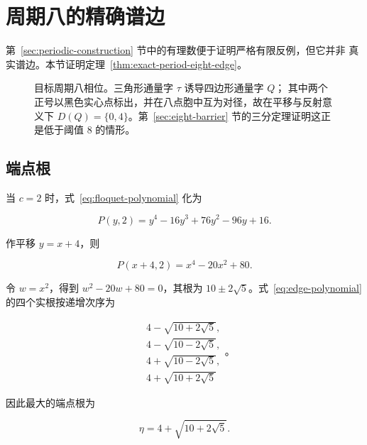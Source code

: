 \section{周期八的精确谱边}\label{sec:period-eight-edge}

第~\ref{sec:periodic-construction} 节中的有理数便于证明严格有限反例，但它并非
真实谱边。本节证明定理~\ref{thm:exact-period-eight-edge}。

\begin{figure}[H]
\centering

\caption{目标周期八相位。三角形通量字 \(\tau\) 诱导四边形通量字 \(Q\)；
其中两个正号以黑色实心点标出，并在八点胞中互为对径，故在平移与反射意义下
\(D(Q)=\{0,4\}\)。第~\ref{sec:eight-barrier} 节的三分定理证明这正是低于阈值
8 的情形。}
\label{fig:period8-target}
\end{figure}

\subsection{端点根}

当 \(c=2\) 时，式~\eqref{eq:floquet-polynomial} 化为

\begin{equation}
\label{eq:edge-polynomial}
P(y,2)=y^{4}-16y^{3}+76y^{2}-96y+16.
\end{equation}

作平移 \(y=x+4\)，则

\begin{equation}
\label{eq:edge-depressed-quartic}
P(x+4,2)=x^{4}-20x^{2}+80.
\end{equation}

令 \(w=x^2\)，得到 \(w^2-20w+80=0\)，其根为
\(10\pm2\sqrt5\)。式~\eqref{eq:edge-polynomial} 的四个实根按递增次序为

\begin{equation}
\label{eq:edge-four-roots}
\begin{aligned}
&4-\sqrt{10+2\sqrt{5}}, \\
&4-\sqrt{10-2\sqrt{5}}, \\
&4+\sqrt{10-2\sqrt{5}}, \\
&4+\sqrt{10+2\sqrt{5}}
\end{aligned}
\text{。}
\end{equation}

因此最大的端点根为

\begin{equation}
\label{eq:eta-definition}
\eta=4+\sqrt{10+2\sqrt{5}}.
\end{equation}

